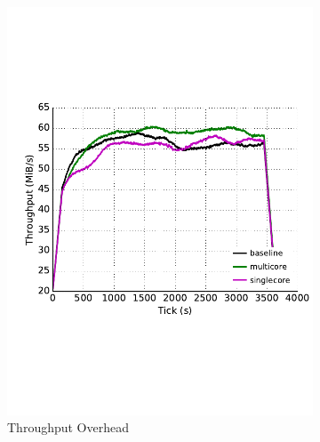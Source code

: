 \begin{figure}
\begin{subfigure}[t]{0.32\textwidth}
\includegraphics[trim={0 3cm 0 3cm}, clip, width=1.0\textwidth]{images/overhead_throughput.pdf}
		\caption{Throughput Overhead}
		\label{fig:overhead_throughput}
	\end{subfigure}
	\begin{subfigure}[t]{0.32\textwidth} \centering

\end{subfigure}
\end{figure}
